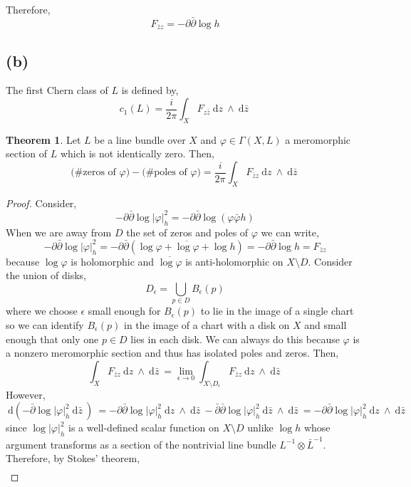 \documentclass[12pt]{extarticle}
\renewcommand{\d}[1]{\: \mathrm{d}#1 \:}
\theoremstyle{definition}
\newtheorem{theorem}{Theorem}[section]
\begin{document}
Therefore,
\[ F_{\bar{z} z} = - \partial \bar{\partial} \log{h} \]


\subsection*{(b)}

The first Chern class of $L$ is defined by,
\[ c_1(L) = \frac{i}{2 \pi} \int_X F_{z \bar{z}} \d{z} \wedge \d{\bar{z}} \]
\begin{theorem}
Let $L$ be a line bundle over $X$ and $\varphi \in \Gamma(X, L)$ a meromorphic section of $L$ which is not identically zero. Then,
\[ \text{(\# zeros of $\varphi$)} - \text{(\# poles of $\varphi$)} = \frac{i}{2 \pi} \int_X F_{\bar{z} z} \d{z} \wedge \d{\bar{z}} \]
\end{theorem}

\begin{proof}
Consider,
\[ - \partial \bar{\partial} \log{|\varphi|_h^2} = - \partial \bar{\partial} \log{(\varphi \bar{\varphi} h)} \]
When we are away from $D$ the set of zeros and poles of $\varphi$ we can write,
\[ - \partial \bar{\partial} \log{|\varphi|_h^2} = - \partial \bar{\partial} \left( \log{\varphi} + \overline{\log{\varphi}} + \log{h} \right) = - \partial \bar{\partial} \log{h} = F_{\bar{z} z} \]
because $\log{\varphi}$ is holomorphic and $\overline{\log{\varphi}}$ is anti-holomorphic on $X \setminus D$. Consider the union of disks,
\[ D_{\epsilon} = \bigcup_{p \in D} B_{\epsilon}(p) \] 
where we choose $\epsilon$ small enough for $B_{\epsilon}(p)$ to lie in the image of a single chart so we can identify $B_{\epsilon}(p)$ in the image of a chart with a disk on $X$ and small enough that only one $p \in D$ lies in each disk. We can always do this because $\varphi$ is a nonzero meromorphic section and thus has isolated poles and zeros. Then,
\[ \int_X F_{\bar{z} z} \d{z} \wedge \d{\bar{z}} = \lim_{\epsilon \to 0} \int_{X \setminus D_{\epsilon}} F_{\bar{z} z} \d{z} \wedge \d{\bar{z}} \]
However, 
\[ \d{(-\bar{\partial} \log{|\varphi|_h^2} \d{\bar{z}})} = - \partial \bar{\partial} \log{|\varphi|_h^2} \d{z} \wedge \d{\bar{z}} - \bar{\partial} \bar{\partial} \log{|\varphi|_h^2} \d{\bar{z}} \wedge \d{\bar{z}} = - \partial \bar{\partial} \log{|\varphi|_h^2} \d{z} \wedge \d{\bar{z}} \]
since $\log{|\varphi|_h^2}$ is a well-defined scalar function on $X \setminus D$ unlike $\log{h}$ whose argument transforms as a section of the nontrivial line bundle $L^{-1} \otimes \bar{L}^{-1}$. Therefore, by Stokes' theorem,
\begin{align*}

\end{align*}
\end{proof}
\end{document}
